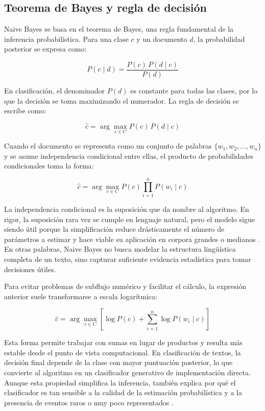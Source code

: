 \subsection{Teorema de Bayes y regla de decisión}

Naive Bayes se basa en el teorema de Bayes, una regla fundamental de la inferencia probabilística. Para una clase $c$ y un documento $d$, la probabilidad posterior se expresa como:

\begin{equation}
P(c \mid d) = \frac{P(c)\,P(d \mid c)}{P(d)}
\label{eq:bayes}
\end{equation}

En clasificación, el denominador $P(d)$ es constante para todas las clases, por lo que la decisión se toma maximizando el numerador. La regla de decisión se escribe como:

\begin{equation}
\hat{c} = \arg\max_{c \in C} P(c)\,P(d \mid c)
\label{eq:decision}
\end{equation}

Cuando el documento se representa como un conjunto de palabras $\{w_1, w_2, \dots, w_n\}$ y se asume independencia condicional entre ellas, el producto de probabilidades condicionales toma la forma:

\begin{equation}
\hat{c} = \arg\max_{c \in C} P(c)\prod_{i=1}^{n}P(w_i \mid c)
\label{eq:naive}
\end{equation}

La independencia condicional es la suposición que da nombre al algoritmo. En rigor, la suposición rara vez se cumple en lenguaje natural, pero el modelo sigue siendo útil porque la simplificación reduce drásticamente el número de parámetros a estimar y hace viable su aplicación en corpora grandes o medianos \cite{Kibriya2005,Frank2006,Schneider2005}. En otras palabras, Naive Bayes no busca modelar la estructura lingüística completa de un texto, sino capturar suficiente evidencia estadística para tomar decisiones útiles.

Para evitar problemas de subflujo numérico y facilitar el cálculo, la expresión anterior suele transformarse a escala logarítmica:

\begin{equation}
\hat{c} = \arg\max_{c \in C} \left[\log P(c) + \sum_{i=1}^{n}\log P(w_i \mid c)\right]
\label{eq:logdecision}
\end{equation}

Esta forma permite trabajar con sumas en lugar de productos y resulta más estable desde el punto de vista computacional. En clasificación de textos, la decisión final depende de la clase con mayor puntuación posterior, lo que convierte al algoritmo en un clasificador generativo de implementación directa. Aunque esta propiedad simplifica la inferencia, también explica por qué el clasificador es tan sensible a la calidad de la estimación probabilística y a la presencia de eventos raros o muy poco representados \cite{10.1007/978-3-540-71496-5_73,Frank2006,ELHINDI2020106652}.

